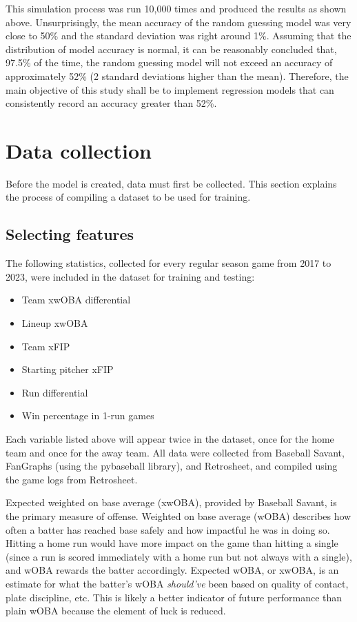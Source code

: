 \documentclass{paper}
\begin{document}
This simulation process was run 10,000 times and produced the results as shown above. Unsurprisingly, the mean accuracy of the random guessing model was very close to 50\% and the standard deviation was right around 1\%. Assuming that the distribution of model accuracy is normal, it can be reasonably concluded that, 97.5\% of the time, the random guessing model will not exceed an accuracy of approximately 52\% (2 standard deviations higher than the mean). Therefore, the main objective of this study shall be to implement regression models that can consistently record an accuracy greater than 52\%.

\section{Data collection}
Before the model is created, data must first be collected. This section explains the process of compiling a dataset to be used for training.

\subsection{Selecting features}
The following statistics, collected for every regular season game from 2017 to 2023, were included in the dataset for training and testing:

\begin{itemize}
\item Team xwOBA differential
\item Lineup xwOBA
\item Team xFIP
\item Starting pitcher xFIP
\item Run differential
\item Win percentage in 1-run games
\end{itemize}

Each variable listed above will appear twice in the dataset, once for the home team and once for the away team. All data were collected from Baseball Savant, FanGraphs (using the pybaseball library), and Retrosheet, and compiled using the game logs from Retrosheet.

Expected weighted on base average (xwOBA), provided by Baseball Savant, is the primary measure of offense. Weighted on base average (wOBA) describes how often a batter has reached base safely and how impactful he was in doing so. Hitting a home run would have more impact on the game than hitting a single (since a run is scored immediately with a home run but not always with a single), and wOBA rewards the batter accordingly. Expected wOBA, or xwOBA, is an estimate for what the batter's wOBA \textit{should've} been based on quality of contact, plate discipline, etc. This is likely a better indicator of future performance than plain wOBA because the element of luck is reduced.
\end{document}
